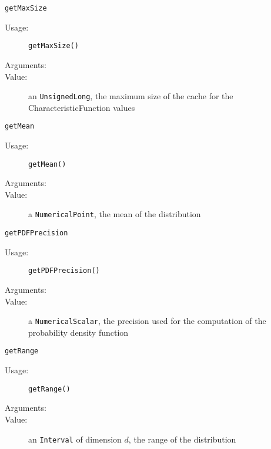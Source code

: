 \begin{description}
\begin{description}
  \item \texttt{getMaxSize}
    \begin{description}
    \item[Usage:]  \texttt{getMaxSize()}
    \item[Arguments:]  \strut
    \item[Value:] an \texttt{UnsignedLong}, the maximum size of the cache for the CharacteristicFunction values
    \end{description}

  \item \texttt{getMean}
    \begin{description}
    \item[Usage:]  \texttt{getMean()}
    \item[Arguments:]  \strut
    \item[Value:] a \texttt{NumericalPoint}, the mean of the distribution
    \end{description}

  \item \texttt{getPDFPrecision}
    \begin{description}
    \item[Usage:]  \texttt{getPDFPrecision()}
    \item[Arguments:]  \strut
    \item[Value:] a \texttt{NumericalScalar}, the precision used for the computation of the probability density function
    \end{description}

  \item \texttt{getRange}
    \begin{description}
    \item[Usage:]  \texttt{getRange()}
    \item[Arguments:]  \strut
    \item[Value:] an \texttt{Interval} of dimension $d$, the range of the distribution
    \end{description}


\end{description}
\end{description}
